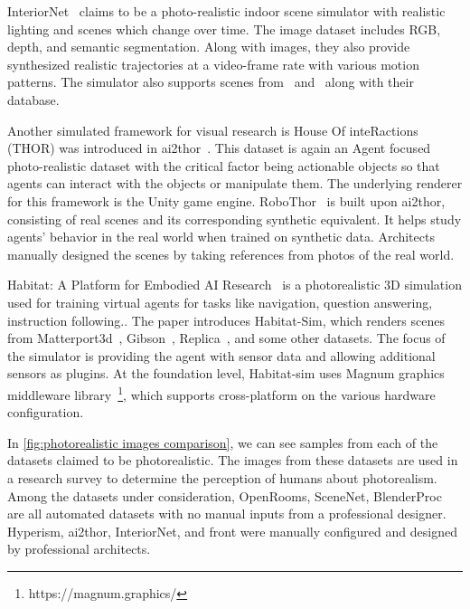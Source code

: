 InteriorNet~\cite{InteriorNet18} claims to be a photo-realistic indoor scene simulator with realistic lighting and scenes which change over time.
The image dataset includes RGB, depth, and semantic segmentation.
Along with images, they also provide synthesized realistic trajectories at a video-frame rate with various motion patterns.
The simulator also supports scenes from~\cite{McCormac:etal:ICCV2017} and~\cite{Song2017SemanticSC} along with their database.

Another simulated framework for visual research is House Of inteRactions (THOR) was introduced in \gls{ai2thor}~\cite{kolve2019ai2thor}.
This dataset is again an Agent focused photo-realistic dataset with the critical factor being actionable objects so that agents can interact with the objects or manipulate them.
The underlying renderer for this framework is the Unity game engine.
RoboThor~\cite{Deitke2020RoboTHORAO} is built upon \gls{ai2thor}, consisting of real scenes and its corresponding synthetic equivalent.
It helps study agents' behavior in the real world when trained on synthetic data.
Architects manually designed the scenes by taking references from photos of the real world.

Habitat: A Platform for Embodied AI Research~\cite{savva2019habitat} is a photorealistic 3D simulation used for training virtual agents for tasks like navigation, question answering, instruction following..
The paper introduces Habitat-Sim, which renders scenes from Matterport3d~\cite{chang2017matterport3d}, Gibson~\cite{xia2018gibson}, Replica~\cite{Straub2019TheRD}, and some other datasets.
The focus of the simulator is providing the agent with sensor data and allowing additional sensors as plugins.
At the foundation level, Habitat-sim uses Magnum graphics
middleware library~\footnote{https://magnum.graphics/}, which supports cross-platform on the various hardware configuration.

In \autoref{fig:photorealistic images comparison}, we can see samples from each of the datasets claimed to be photorealistic.
The images from these datasets are used in a research survey to determine the perception of humans about photorealism.
Among the datasets under consideration,
OpenRooms, SceneNet, BlenderProc are all automated datasets with no manual inputs from a professional designer.
Hyperism, \gls{ai2thor}, InteriorNet, and \gls{front} were manually configured and designed by professional architects.


